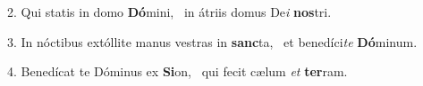 2. Qui statis in domo \textbf{Dó}mini, \ast\  in átriis domus De\textit{i} \textbf{nos}tri.\

3. In nóctibus extóllite manus vestras in \textbf{sanc}ta, \ast\  et benedíci\textit{te} \textbf{Dó}minum.\

4. Benedícat te Dóminus ex \textbf{Si}on, \ast\  qui fecit cælum \textit{et} \textbf{ter}ram.\

